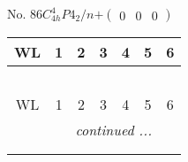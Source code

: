 \documentclass[fleqn,9pt,landscape]{jsarticle}
\begin{document}
\newpage
No. 86\quad$C_{4h}^{4}$\quad$P4_2/n$\quad[ tetragonal ]\quad$+\begin{pmatrix} 0 & 0 & 0 \end{pmatrix}$
\begin{center}
\renewcommand{\arraystretch}{1.2}
\begin{longtable}{ccccccc}
 \hline \hline
WL & 1 & 2 & 3 & 4 & 5 & 6 \\ \hline \endfirsthead

\multicolumn{6}{l}{\tablename\ \thetable{}} \\
 \hline \hline
WL & 1 & 2 & 3 & 4 & 5 & 6 \\ \hline \endhead

 \hline \hline
\multicolumn{6}{r}{\footnotesize\it continued ...} \\ \endfoot

 \hline \hline
\multicolumn{6}{r}{} \\ \endlastfoot


\end{longtable}
\end{center}
\end{document}
